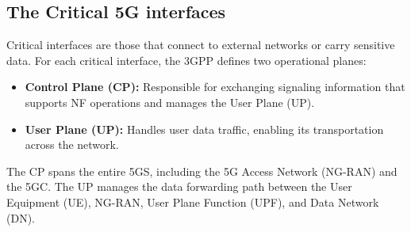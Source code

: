\documentclass{report}
\begin{document}
\subsection{The Critical 5G interfaces}
Critical interfaces are those that connect to external networks or carry sensitive data. For each critical interface, the 3GPP defines two operational planes:
\begin{itemize}
    \item \textbf{Control Plane (CP):} Responsible for exchanging signaling information that supports NF operations and manages the User Plane (UP).
    \item \textbf{User Plane (UP):} Handles user data traffic, enabling its transportation across the network.
\end{itemize}
The CP spans the entire 5GS, including the 5G Access Network (NG-RAN) and the 5GC. The UP manages the data forwarding path between the User Equipment (UE), NG-RAN, User Plane Function (UPF), and Data Network (DN).
\end{document}
